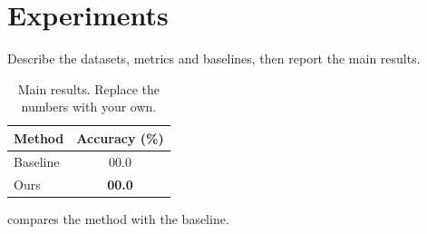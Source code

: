 \section{Experiments}
\label{sec:experiments}

Describe the datasets, metrics and baselines, then report the main results.

\begin{table}[ht]
  \centering
  \begin{tabular}{@{}lc@{}}
    \toprule
    Method & Accuracy (\%) \\
    \midrule
    Baseline & 00.0 \\
    Ours & \textbf{00.0} \\
    \bottomrule
  \end{tabular}
  \caption{Main results. Replace the numbers with your own.}
  \label{tab:results}
\end{table}

 compares the method with the baseline.

